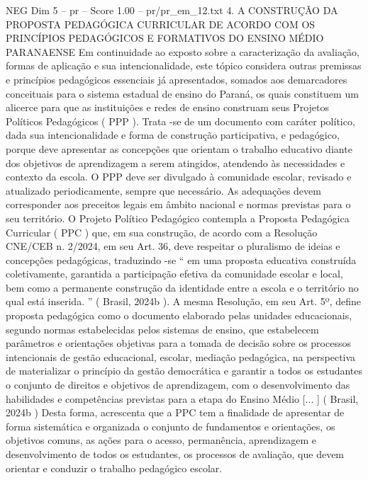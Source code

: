 \begin{textsample}{NEG Dim 5 – pr – Score 1.00 – pr/pr\_em\_12.txt}  \label{ex:f5_neg_240}
4.
A CONSTRUÇÃO DA PROPOSTA PEDAGÓGICA CURRICULAR DE ACORDO COM OS PRINCÍPIOS PEDAGÓGICOS E FORMATIVOS DO ENSINO MÉDIO PARANAENSE Em continuidade ao exposto sobre a caracterização da avaliação, formas de aplicação e sua intencionalidade, este tópico considera outras premissas e princípios pedagógicos essenciais já apresentados, somados aos demarcadores conceituais para o sistema estadual de ensino do Paraná, os quais constituem um alicerce para que as instituições e redes de ensino construam seus Projetos Políticos Pedagógicos ( PPP ).
Trata -se de um documento com caráter político, dada sua intencionalidade e forma de construção participativa, e pedagógico, porque deve apresentar as concepções que orientam o trabalho educativo diante dos objetivos de aprendizagem a serem atingidos, atendendo às necessidades e contexto da escola.
O PPP deve ser divulgado à comunidade escolar, revisado e atualizado periodicamente, sempre que necessário.
As adequações devem corresponder aos preceitos legais em âmbito nacional e normas previstas para o seu território.
O Projeto Político Pedagógico contempla a Proposta Pedagógica Curricular ( PPC ) que, em sua construção, de acordo com a Resolução CNE/CEB n. 2/2024, em seu Art. 36, deve respeitar o pluralismo de ideias e concepções pedagógicas, traduzindo -se “ em uma proposta educativa construída coletivamente, garantida a participação efetiva da comunidade escolar e local, bem como a permanente construção da identidade entre a escola e o território no qual está inserida. ” ( Brasil, 2024b ).
A mesma Resolução, em seu Art. 5º, define proposta pedagógica como o documento elaborado pelas unidades educacionais, segundo normas estabelecidas pelos sistemas de ensino, que estabelecem parâmetros e orientações objetivas para a tomada de decisão sobre os processos intencionais de gestão educacional, escolar, mediação pedagógica, na perspectiva de materializar o princípio da gestão democrática e garantir a todos os estudantes o conjunto de direitos e objetivos de aprendizagem, com o desenvolvimento das habilidades e competências previstas para a etapa do Ensino Médio [... ] ( Brasil, 2024b ) Desta forma, acrescenta que a PPC tem a finalidade de apresentar de forma sistemática e organizada o conjunto de fundamentos e orientações, os objetivos comuns, as ações para o acesso, permanência, aprendizagem e desenvolvimento de todos os estudantes, os processos de avaliação, que devem orientar e conduzir o trabalho pedagógico escolar.

\end{textsample}
